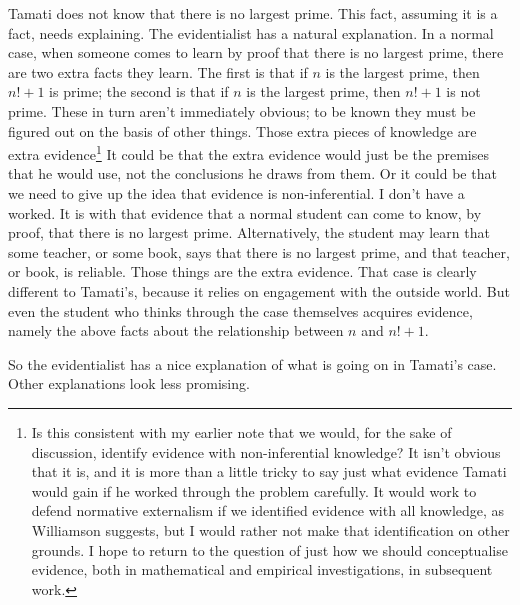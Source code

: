 \gls{Tamati} does not know that there is no largest prime. This fact, assuming it is a fact, needs explaining. The evidentialist has a natural explanation. In a normal case, when someone comes to learn by proof that there is no largest prime, there are two extra facts they learn. The first is that if $n$ is the largest prime, then $n! + 1$ is prime; the second is that if $n$ is the largest prime, then $n! + 1$ is not prime. These in turn aren't immediately obvious; to be known they must be figured out on the basis of other things. Those extra pieces of knowledge are extra evidence\footnote{Is this consistent with my earlier note that we would, for the sake of discussion, identify evidence with non-inferential knowledge? It isn't obvious that it is, and it is more than a little tricky to say just what evidence \gls{Tamati} would gain if he worked through the problem carefully. It would work to defend normative externalism if we identified evidence with all knowledge, as Williamson suggests, but I would rather not make that identification on other grounds. I hope to return to the question of just how we should conceptualise evidence, both in mathematical and empirical investigations, in subsequent work.} It could be that the extra evidence would just be the premises that he would use, not the conclusions he draws from them. Or it could be that we need to give up the idea that evidence is non-inferential. I don't have a worked. It is with that evidence that a normal student can come to know, by proof, that there is no largest prime. Alternatively, the student may learn that some teacher, or some book, says that there is no largest prime, and that teacher, or book, is reliable. Those things are the extra evidence. That case is clearly different to \gls{Tamati}'s, because it relies on engagement with the outside world. But even the student who thinks through the case themselves acquires evidence, namely the above facts about the relationship between $n$ and $n! + 1$.

So the evidentialist has a nice explanation of what is going on in \gls{Tamati}'s case. Other explanations look less promising.

